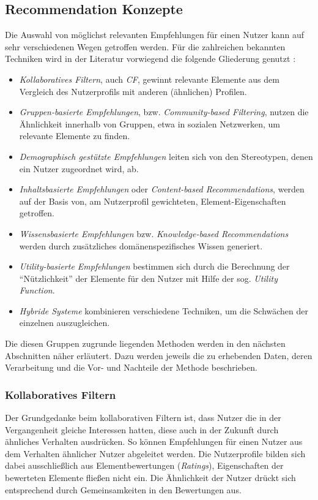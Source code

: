 \subsection{Recommendation Konzepte}\label{sec:concept}
Die Auswahl von möglichst relevanten Empfehlungen für einen Nutzer kann auf sehr verschiedenen Wegen getroffen werden. Für die zahlreichen bekannten Techniken wird in der Literatur vorwiegend die folgende Gliederung genutzt \citep[Kap. 1]{hb} \citep{Burke:2002:HRS:586321.586352} \citep{rs}:

\begin{itemize}
\item \textit{Kollaboratives Filtern}, auch \textit{\acf{CF}}, gewinnt relevante Elemente aus dem Vergleich des Nutzerprofils mit anderen  (ähnlichen) Profilen.
\item \textit{Gruppen-basierte Empfehlungen}, bzw. \textit{Community-based Filtering}, nutzen die Ähnlichkeit innerhalb von Gruppen, etwa in sozialen Netzwerken, um relevante Elemente zu finden.
\item \textit{Demographisch gestützte Empfehlungen} leiten sich von den Stereotypen, denen ein Nutzer zugeordnet wird, ab.
\item \textit{Inhaltsbasierte Empfehlungen} oder \textit{Content-based Recommendations}, werden auf der Basis von, am Nutzerprofil gewichteten, Element-Eigenschaften getroffen.
\item \textit{Wissensbasierte Empfehlungen} bzw. \textit{Knowledge-based Recommendations} werden durch zusätzliches domänenspezifisches Wissen generiert.
\item \textit{Utility-basierte Empfehlungen} bestimmen sich durch die Berechnung der ``Nützlichkeit'' der Elemente für den Nutzer mit Hilfe der sog. \textit{Utility Function}.
\item \textit{Hybride Systeme} kombinieren verschiedene Techniken, um die Schwächen der einzelnen auszugleichen.
\end{itemize}

Die diesen Gruppen zugrunde liegenden Methoden werden in den nächsten Abschnitten näher erläutert. Dazu werden jeweils die zu erhebenden Daten, deren Verarbeitung und die Vor- und Nachteile der Methode beschrieben. %

\subsubsection{Kollaboratives Filtern}
\label{sec:cf_overview}
Der Grundgedanke beim kollaborativen Filtern ist, dass Nutzer die in der Vergangenheit gleiche Interessen hatten, diese auch in der Zukunft durch ähnliches Verhalten ausdrücken. So können Empfehlungen für einen Nutzer aus dem Verhalten ähnlicher Nutzer abgeleitet werden. Die Nutzerprofile bilden sich dabei ausschließlich aus Elementbewertungen (\textit{Ratings}), Eigenschaften der bewerteten Elemente fließen nicht ein.  Die Ähnlichkeit der Nutzer drückt sich entsprechend durch Gemeinsamkeiten in den Bewertungen aus. \citep[Kap. 2]{rs}

